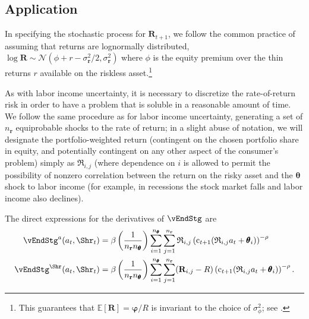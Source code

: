 \documentclass[titlepage, headings=optiontotocandhead]{Resources/texmf-local/tex/latex/econtex}
\begin{document}
\subsection{Application}\label{subsec:MCApplication}


In specifying the stochastic process for ${\mathbf{R}}_{t+1}$, we follow the common practice of assuming that returns are lognormally distributed, $\log {\mathbf{R}} \sim \mathcal{N}(\phi+r-\sigma^{2}_{{\mathbf{r}}}/2,\sigma^{2}_{{\mathbf{r}}})$ where $\phi$ is the equity premium over the thin returns $r$ available on the riskless asset.\footnote{This guarantees that ${\mathbb{E}}[{\mathbf{R}}] = \pmb{\varphi}/R$ is invariant to the choice of $\sigma^{2}_{\phi}$; see .}

As with labor income uncertainty, it is necessary to discretize the rate-of-return risk in order to have a problem that is soluble in a reasonable amount of time.  We follow the same procedure as for labor income uncertainty, generating a set of $n_{{\mathbf{r}}}$ equiprobable shocks to the rate of return; in a slight abuse of notation, we will designate the portfolio-weighted return (contingent on the chosen portfolio share in equity, and potentially contingent on any other aspect of the consumer's problem) simply as $\mathfrak{R}_{i,j}$ (where dependence on $i$ is allowed to permit the possibility of nonzero correlation between the return on the risky asset and the $\pmb{\theta}$ shock to labor income (for example, in recessions the stock market falls and labor income also declines).

The direct expressions for the derivatives of $\vEndStg$ are
\begin{equation}\begin{gathered}\begin{aligned}
      \vEndStg^{a}(a_{t},\Shr_{t})  & = \beta \left(\frac{1}{n_{{\mathbf{r}}} n_{\pmb{\theta}}}\right)\sum_{i=1}^{n_{\pmb{\theta}}}\sum_{j=1}^{n_{{\mathbf{r}}} }\mathfrak{R}_{i,j} \left(\mathrm{c}_{t+1}(\mathfrak{R}_{i,j}a_{t}+\pmb{\theta}_{i})\right)^{-\rho}
      \\      \vEndStg^{\Shr}(a_{t},\Shr_{t})  & = \beta \left(\frac{1}{n_{{\mathbf{r}}} n_{\pmb{\theta}}}\right)\sum_{i=1}^{n_{\pmb{\theta}}}\sum_{j=1}^{n_{{\mathbf{r}}} }({\mathbf{R}}_{i,j}-R)\left(\mathrm{c}_{t+1}(\mathfrak{R}_{i,j}a_{t}+\pmb{\theta}_{i})\right)^{-\rho}.
    \end{aligned}\end{gathered}\end{equation}
\end{document}
